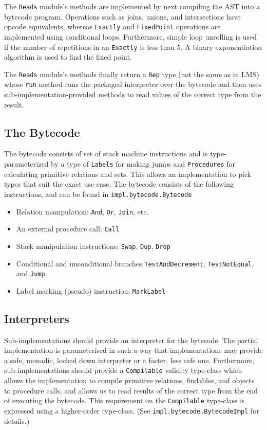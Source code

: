 \documentclass{report}
\newcommand \2[0]{\textbf{2}}
\newcommand \3[0]{\textbf{3}}
\begin{document}
The \texttt{Reads} module's methods are implemented by next compiling the AST into a bytecode program. Operations such as joins, unions, and intersections have opcode equivalents, whereas \texttt{Exactly} and \texttt{FixedPoint} operations are implemented using conditional loops. Furthermore, simple loop unrolling is used if the number of repetitions in an \texttt{Exactly} is less than 5. A binary exponentiation algorithm is used to find the fixed point.

The \texttt{Reads} module's methods finally return a \texttt{Rep} type (not the same as in LMS) whose \texttt{run} method runs the packaged interpreter over the bytecode and then uses sub-implementation-provided methods to read values of the correct type from the result.


\subsection{The Bytecode}
The bytecode consists of set of stack machine instructions and is type-parameterized by a type of \texttt{Labels} for making jumps and \texttt{Procedures} for calculating primitive relations and sets. This allows an implementation to pick types that suit the exact use case. The bytecode consists of the following instructions, and can be found in \texttt{impl.bytecode.Bytecode}

\begin{itemize}
    \item Relation manipulation: \texttt{And}, \texttt{Or}, \texttt{Join}, etc.
    \item An external procedure call: \texttt{Call}
    \item Stack manipulation instructions: \texttt{Swap}, \texttt{Dup}, \texttt{Drop}
    \item Conditional and unconditional branches \texttt{TestAndDecrement}, \texttt{TestNotEqual}, and \texttt{Jump}.
    \item Label marking (pseudo) instruction: \texttt{MarkLabel}
\end{itemize}


\subsection{Interpreters}
Sub-implementations should provide an interpreter for the bytecode. The partial implementation is parameterised in such a way that implementations may provide a safe, monadic, locked down interpreter or a faster, less safe one. Furthermore, sub-implementations should provide a \texttt{Compilable} validity type-class which allows the implementation to compile primitive relations, findables, and objects to procedure calls, and allows us to read results of the correct type from the end of executing the bytecode. This requirement on the \texttt{Compilable} type-class is expressed using a higher-order type-class. (See \texttt{impl.bytecode.BytecodeImpl} for details.) 
\end{document}
